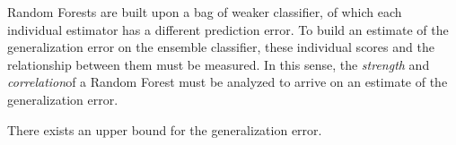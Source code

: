 Random Forests are built upon a bag of weaker classifier, of which each individual estimator has a different prediction error.
To build an estimate of the generalization error on the ensemble classifier, these individual scores and the relationship between them must be measured.
In this sense, the \textit{strength} and \textit{correlation}of a Random Forest must be analyzed to arrive on an estimate of the generalization error.


\begin{theorem}
There exists an upper bound for the generalization error.
\end{theorem}


